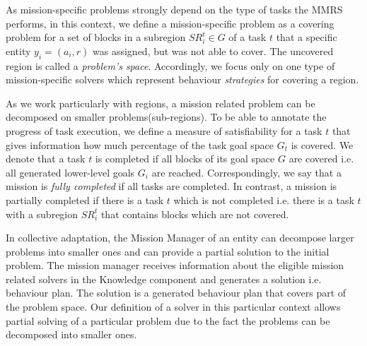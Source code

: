 \documentclass[journal]{IEEEtran}
\theoremstyle{definition}
\newcommand\darko[1]{\nb{Darko}{#1}}
\begin{document}
 As mission-specific problems strongly depend on the type of tasks the MMRS performs, in this context, we define a mission-specific problem as a covering problem for a set of blocks in a subregion $SR^t_i \in G$ of a task $t$ that a specific entity $y_i=(a_i,r)$  was assigned, but was not able to cover. The uncovered region is called a \textit{problem's space}.
Accordingly, we focus only on one type of mission-specific solvers which represent behaviour \textit{strategies} for covering a region.


As we work particularly with regions, a mission related problem can be decomposed on smaller problems(sub-regions). 
To be able to annotate the progress of task execution, we define a measure of satisfiability for a task $t$ that gives information how much percentage of the task goal space $G_t$ is covered. %
We denote that a task $t$ is completed if all blocks of its goal space $G$ are covered i.e. all generated lower-level goals $G_i$ are reached. Correspondingly, we  say  that  a  mission is \textit{fully completed} if all tasks are completed. 
In contrast, a mission is partially completed if there is a task $t$ which is not completed i.e. there is a task $t$ with a subregion $SR^t_i$ that contains blocks which are not covered.



In collective adaptation, the Mission Manager of an entity can decompose larger problems into smaller ones and can provide a partial solution to the initial problem. 
The mission manager receives information about the eligible mission related solvers in the Knowledge component and generates a solution i.e. behaviour plan. The solution is a generated behaviour plan that covers part of the problem space.
Our definition of a solver in this particular context allows partial solving of a particular problem due to the fact the problems can be decomposed into smaller ones. 
\end{document}
